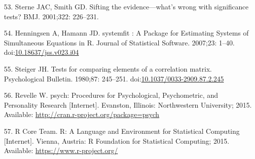 \documentclass[]{article}
\begin{document}
\hypertarget{ref-Sterne2001}{}
53. Sterne JAC, Smith GD. Sifting the evidence---what's wrong with
significance tests? BMJ. 2001;322: 226--231.

\hypertarget{ref-Henningsen2007}{}
54. Henningsen A, Hamann JD. systemfit : A Package for Estimating
Systems of Simultaneous Equations in R. Journal of Statistical Software.
2007;23: 1--40.
doi:\href{https://doi.org/10.18637/jss.v023.i04}{10.18637/jss.v023.i04}

\hypertarget{ref-Steiger1980}{}
55. Steiger JH. Tests for comparing elements of a correlation matrix.
Psychological Bulletin. 1980;87: 245--251.
doi:\href{https://doi.org/10.1037/0033-2909.87.2.245}{10.1037/0033-2909.87.2.245}

\hypertarget{ref-Revelle2015}{}
56. Revelle W. psych: Procedures for Psychological, Psychometric, and
Personality Research {[}Internet{]}. Evanston, Illinois: Northwestern
University; 2015. Available:
\url{http://cran.r-project.org/package=psych}

\hypertarget{ref-RCoreTeam2015}{}
57. R Core Team. R: A Language and Environment for Statistical Computing
{[}Internet{]}. Vienna, Austria: R Foundation for Statistical Computing;
2015. Available: \url{https://www.r-project.org/}
\end{document}
